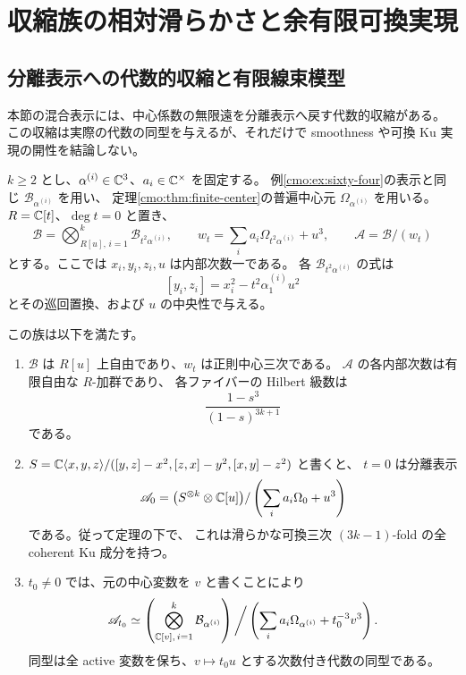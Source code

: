 \section{収縮族の相対滑らかさと余有限可換実現}
\label{mix:sec:relative-smoothness}

\subsection{分離表示への代数的収縮と有限線束模型}

本節の混合表示には、中心係数の無限遠を分離表示へ戻す代数的収縮がある。
この収縮は実際の代数の同型を与えるが、それだけで
smoothness や可換 Ku 実現の開性を結論しない。

\begin{proposition}[混合係数の収縮と中心係数の三乗被覆]
\label{cmo:prop:contraction}
$k\geq2$ とし、$\alpha^{(i)}\in\mathbb C^3$、$a_i\in\mathbb C^\times$ を固定する。
例\ref{cmo:ex:sixty-four}の表示と同じ
$\mathcal B_{\alpha^{(i)}}$ を用い、
定理\ref{cmo:thm:finite-center}の普遍中心元
$\Omega_{\alpha^{(i)}}$ を用いる。
$R=\mathbb C[t]$、$\deg t=0$ と置き、
\[
 \mathscr B=
   \bigotimes_{R[u],\,i=1}^{k}\mathcal B_{t^2\alpha^{(i)}},
 \qquad
 w_t=\sum_i a_i\Omega_{t^2\alpha^{(i)}}+u^3,
 \qquad \mathscr A=\mathscr B/(w_t)
\]
とする。ここでは $x_i,y_i,z_i,u$ は内部次数一である。
各 $\mathcal B_{t^2\alpha^{(i)}}$ の式は
\[
 [y_i,z_i]=x_i^2-t^2\alpha^{(i)}_1u^2
\]
とその巡回置換、および $u$ の中央性で与える。

この族は以下を満たす。
\begin{enumerate}[label=(\arabic*)]
\item $\mathscr B$ は $R[u]$ 上自由であり、$w_t$ は正則中心三次である。
      $\mathscr A$ の各内部次数は有限自由な $R$-加群であり、
      各ファイバーの Hilbert 級数は
      \[
        \frac{1-s^3}{(1-s)^{3k+1}}
      \]
      である。
\item $S=\mathbb C\langle x,y,z\rangle/
      ([y,z]-x^2,[z,x]-y^2,[x,y]-z^2)$ と書くと、
      $t=0$ は分離表示
      \[
       \mathscr A_0=
       \bigl(S^{\otimes k}\otimes\mathbb C[u]\bigr)/
          \left(\sum_i a_i\Omega_0+u^3\right)
      \]
      である。従って定理の下で、
      これは滑らかな可換三次 $(3k-1)$-fold の全 coherent Ku 成分を持つ。
\item $t_0\ne0$ では、元の中心変数を $v$ と書くことにより
      \begin{equation}\label{cmo:eq:contraction-isomorphism}
       \mathscr A_{t_0}\simeq
       \left(\bigotimes_{\mathbb C[v],\,i=1}^{k}
                           \mathcal B_{\alpha^{(i)}}\right)
       \bigg/\left(\sum_i a_i\Omega_{\alpha^{(i)}}+t_0^{-3}v^3\right).
      \end{equation}
      同型は全 active 変数を保ち、$v\mapsto t_0u$ とする次数付き代数の同型である。
\end{enumerate}
\end{proposition}


